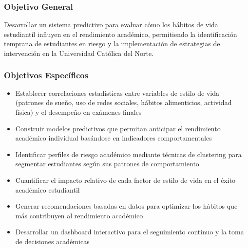 \documentclass[12pt,letterpaper]{report}
\begin{document}
\subsubsection{Objetivo General}
Desarrollar un sistema predictivo para evaluar cómo los hábitos de vida estudiantil influyen en el 
rendimiento académico, permitiendo la identificación temprana de estudiantes en riesgo y la 
implementación de estrategias de intervención en la Universidad Católica del Norte.

\subsubsection{Objetivos Específicos}
\begin{itemize}
\item Establecer correlaciones estadísticas entre variables de estilo de vida (patrones de sueño, uso de redes sociales, hábitos alimenticios, actividad física) y el desempeño en exámenes finales
\item Construir modelos predictivos que permitan anticipar el rendimiento académico individual basándose en indicadores comportamentales
\item Identificar perfiles de riesgo académico mediante técnicas de clustering para segmentar estudiantes según sus patrones de comportamiento
\item Cuantificar el impacto relativo de cada factor de estilo de vida en el éxito académico estudiantil
\item Generar recomendaciones basadas en datos para optimizar los hábitos que más contribuyen al rendimiento académico
\item Desarrollar un dashboard interactivo para el seguimiento continuo y la toma de decisiones académicas
\end{itemize}
\end{document}
